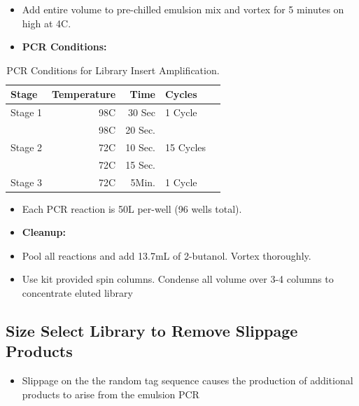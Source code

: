 \documentclass[a4paper]{article}
\begin{document}
        \begin{itemize}
			
            \item Add entire volume to pre-chilled emulsion mix and vortex for 5 minutes on high at 4C.
        	
            \item \textbf{PCR Conditions:}
            
         \end{itemize}
         \FloatBarrier
         \begin{table}[H]
			\centering
			\begin{tabular}{l|r|r|l|r}
				Stage 	& 	Temperature	&	Time	&	Cycles		\\\hline
				Stage 1	&	98C			&	30 Sec	&	1 Cycle		\\\hline
						&	98C			&	20 Sec.	&				\\
                Stage 2	&	72C			&	10 Sec.	&	15 Cycles	\\
                  		&	72C			&	15 Sec.	&				\\\hline
                Stage 3	&	72C			&	5Min.	&	1 Cycle		\\
				\end{tabular}
           		\caption{\label{LibPCR}PCR Conditions for Library Insert Amplification.}
          \end{table}
            
        \begin{itemize}
        
			\item Each PCR reaction is 50\textmu L per-well (96 wells total).
        	
            \item \textbf{Cleanup:}
            
            \item Pool all reactions and add 13.7mL of 2-butanol. Vortex thoroughly.
            
            \item Use kit provided spin columns. Condense all volume over 3-4 columns to concentrate eluted library

        \end{itemize}
	
    \subsection{Size Select Library to Remove Slippage Products} 
      	\begin{itemize}
    		\item Slippage on the the random tag sequence causes the production of additional products to arise from the emulsion PCR
        
        \end{itemize}
        
\end{document}
